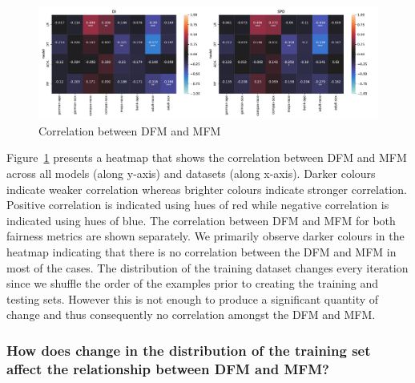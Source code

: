 \documentclass{article}
\begin{document}
\begin{figure}
  \centering
  \includegraphics[width=0.95\linewidth]{heatmap--corr--full-data.pdf}
  \caption{Correlation between DFM and MFM}
  \label{fig:heatmap--corr--full-data}
\end{figure}

Figure \ref{fig:heatmap--corr--full-data} presents a heatmap that
shows the correlation between DFM and MFM across all models (along
y-axis) and datasets (along x-axis). Darker colours indicate weaker
correlation whereas brighter colours indicate stronger
correlation. Positive correlation is indicated using hues of red while
negative correlation is indicated using hues of blue. The correlation
between DFM and MFM for both fairness metrics are shown separately. We
primarily observe darker colours in the heatmap indicating that there
is no correlation between the DFM and MFM in most of the cases. The
distribution of the training dataset changes every iteration since we
shuffle the order of the examples prior to creating the training and
testing sets. However this is not enough to produce a significant
quantity of change and thus consequently no correlation amongst the
DFM and MFM.

\subsubsection{How does change in the distribution of the training set
  affect the relationship between DFM and MFM?}\label{sec:results-full-rel-dist}
\end{document}
